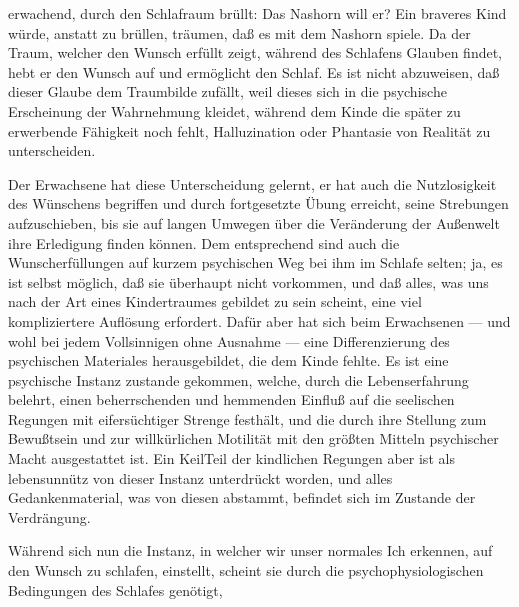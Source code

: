 \documentclass[twoside=true,titlepage=false,open=any, parskip=never, fontsize=10pt, headings=small, chapterprefix=false, appendixprefix=false]{scrbook}
\begin{document}
         
            
            
            
        \pstart
        erwachend, durch den Schlafraum brüllt: Das
                  Nashorn will er? Ein braveres Kind würde, anstatt zu brüllen, träumen, daß es mit dem Nashorn spiele. Da der
               Traum, welcher den Wunsch erfüllt zeigt, während des Schlafens Glauben findet, hebt er den Wunsch auf und
               ermöglicht den Schlaf. Es ist nicht abzuweisen, daß dieser Glaube dem
               Traumbilde zufällt, weil dieses sich in die psychische Erscheinung der
               Wahrnehmung kleidet, während dem Kinde die später zu erwerbende Fähigkeit
               noch fehlt, Halluzination oder Phantasie von Realität zu unterscheiden.
        \pend
    
            
        \pstart
        Der Erwachsene hat diese Unterscheidung gelernt, er hat auch die Nutzlosigkeit
               des Wünschens begriffen und durch fortgesetzte Übung erreicht, seine Strebungen
               aufzuschieben, bis sie auf langen Umwegen über die Veränderung der Außenwelt
               ihre Erledigung finden können. Dem entsprechend sind auch die
               Wunscherfüllungen auf kurzem psychischen Weg bei ihm im Schlafe selten; ja,
               es ist selbst möglich, daß sie überhaupt nicht vorkommen, und daß alles,
               was uns nach der Art eines Kindertraumes gebildet zu sein scheint, eine viel
               kompliziertere Auflösung erfordert. Dafür aber hat sich beim Erwachsenen — und
               wohl bei jedem Vollsinnigen ohne Ausnahme — eine Differenzierung des psychischen
               Materiales herausgebildet, die dem Kinde fehlte. Es ist eine psychische
               Instanz zustande gekommen, welche, durch die Lebenserfahrung belehrt, einen
               beherrschenden und hemmenden Einfluß auf die seelischen Regungen mit
               eifersüchtiger Strenge festhält, und die durch ihre Stellung zum Bewußtsein und
               zur willkürlichen Motilität mit den größten Mitteln psychischer Macht
               ausgestattet ist. Ein KeilTeil der kindlichen Regungen aber ist als
               lebensunnütz von dieser Instanz unterdrückt worden, und alles Gedankenmaterial, was von diesen abstammt, befindet sich im Zustande der
               Verdrängung.
        \pend
    
            
        \pstart
        Während sich nun die Instanz, in welcher wir unser normales Ich erkennen, auf
               den Wunsch zu schlafen, einstellt, scheint sie durch die psychophysiologischen
               Bedingungen des Schlafes genötigt,
        \pend
    
\end{document}
